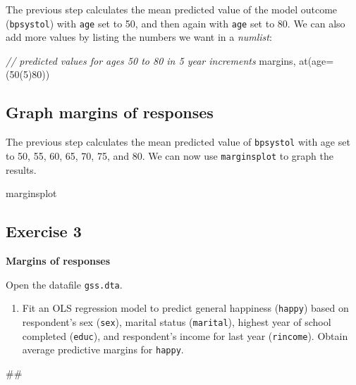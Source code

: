 \documentclass[
]{book}
\newenvironment{Shaded}{\begin{snugshade}}{\end{snugshade}}
\newcommand{\CommentTok}[1]{\textcolor[rgb]{0.56,0.35,0.01}{\textit{#1}}}
\newcommand{\FunctionTok}[1]{\textcolor[rgb]{0.00,0.00,0.00}{#1}}
\newcommand{\NormalTok}[1]{#1}
\providecommand{\tightlist}{%
  \setlength{\itemsep}{0pt}\setlength{\parskip}{0pt}}
\begin{document}
The previous step calculates the mean predicted value of the model outcome (\texttt{bpsystol}) with \texttt{age} set to 50, and then again with \texttt{age} set to 80. We can also add more values by listing the numbers we want in a \emph{numlist}:

\begin{Shaded}
\begin{Highlighting}[]
\CommentTok{// predicted values for ages 50 to 80 in 5 year increments}
\NormalTok{margins, }\FunctionTok{at}\NormalTok{(age=(50(5)80))}
\end{Highlighting}
\end{Shaded}

\hypertarget{graph-margins-of-responses}{%
\subsection{Graph margins of responses}\label{graph-margins-of-responses}}

The previous step calculates the mean predicted value of \texttt{bpsystol} with age set to 50, 55, 60, 65, 70, 75, and 80. We can now use \texttt{marginsplot} to graph the results.

\begin{Shaded}
\begin{Highlighting}[]
\NormalTok{marginsplot}
\end{Highlighting}
\end{Shaded}

\hypertarget{exercise-3-5}{%
\subsection{Exercise 3}\label{exercise-3-5}}

\textbf{Margins of responses}

Open the datafile \texttt{gss.dta}.

\begin{enumerate}
\def\labelenumi{\arabic{enumi}.}
\tightlist
\item
  Fit an OLS regression model to predict general happiness (\texttt{happy}) based on respondent's sex (\texttt{sex}), marital status (\texttt{marital}), highest year of school completed (\texttt{educ}), and respondent's income for last year (\texttt{rincome}). Obtain average predictive margins for \texttt{happy}.
\end{enumerate}

\begin{Shaded}
\begin{Highlighting}[]
\NormalTok{\#\#}
\end{Highlighting}
\end{Shaded}
\end{document}
